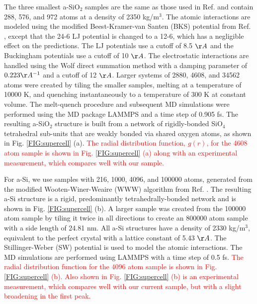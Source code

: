 \documentclass[aps,prb,twocolumn,superscriptaddress,footinbib,amsmath,amssymb,floatfix]{revtex4}
\begin{document}
The three smallest a-SiO$_2$ samples are the same as those used 
in Ref.  
and contain 288, 576, and 972 atoms at a density of 2350 kg/m$^3$. 
The atomic interactions are modeled using 
the modified Beest-Kramer-van Santen (BKS) potential
\cite{van_Beest_force_1990,kramer_interatomic_1991}
from Ref. 
, except that the 24-6 
LJ potential\cite{guissani_numerical_1996} 
is changed to a 12-6, 
which has a negligible effect on the predictions.  
The LJ potentials use a cutoff of 8.5 $\AA$ and the Buckingham 
potentials use a cutoff of 10 $\AA$. 
The electrostatic interactions are handled using the Wolf direct 
summation method with 
a damping parameter of $0.223 \AA^{-1}$ and a cutoff 
of 12 $\AA$.\cite{wolf_exact_1999} 
Larger systems of 2880, 4608, and 34562 atoms were created by 
tiling the smaller samples, melting at a temperature of 10000 K,  
and quenching instantaneously to a temperature of 300 K at 
constant volume. 
The melt-quench procedure and subsequent MD simulations were 
performed using the MD package 
LAMMPS and a time step of 0.905 fs.\cite{plimpton_fast_1995} 
The resulting a-SiO$_2$ structure is built from a network 
of rigidly-bonded SiO$_4$ tetrahedral sub-units that are weakly 
bonded via shared oxygen atoms, 
as shown in Fig. \ref{FIG:supercell} (a). 
\textcolor{red}{The radial distribution function, 
$g(r)$, for the 4608 atom 
sample is shown in Fig. \ref{FIG:supercell} (a) along with an 
experimental measurement,\cite{lorch_neutron_1969} which 
compares well with our sample.}

For a-Si, we use samples 
with 216, 1000, 4096, and 100000 atoms, generated from the 
modified Wooten-Winer-Weaire (WWW) algorithm 
from Ref. . 
The resulting a-Si structure is a rigid, predominantly 
tetrahedrally-bonded network and is shown in 
Fig. \ref{FIG:supercell} (b).  
A larger sample was created from the 100000 atom sample 
by tiling it twice in all directions to create an 
800000 atom sample with a side length of 24.81 nm.  
All a-Si structures have a density of 2330 kg/m$^3$, 
equivalent to the perfect 
crystal with a lattice constant of 5.43 $\AA$. 
The Stillinger-Weber (SW) potential is used to model the atomic 
interactions.\cite{stillinger_computer_1985} The MD simulations 
are performed using LAMMPS with a time step of 0.5 fs. 
\textcolor{red}{The radial distribution function for the 4096 atom 
sample is shown in Fig. \ref{FIG:supercell} (b). 
Also shown in Fig. \ref{FIG:supercell} (b) is an experimental 
measurement,\cite{laaziri_high-energy_1999} 
which compares well with our current sample, but with a slight 
broadening in the first peak.}
\end{document}
